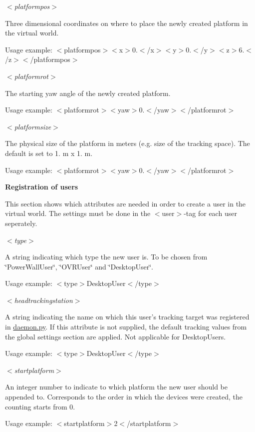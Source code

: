 {\itshape $<$platformpos$>$\/}\par
 \-Three dimensional coordinates on where to place the newly created platform in the virtual world.\par
 \-Usage example\-: {\ttfamily $<$platformpos$>$$<$x$>$0.$<$/x$>$$<$y$>$0.$<$/y$>$$<$z$>$6.$<$/z$>$$<$/platformpos$>$}

{\itshape $<$platformrot$>$\/}\par
 \-The starting yaw angle of the newly created platform.\par
 \-Usage example\-: {\ttfamily $<$platformrot$>$$<$yaw$>$0.$<$/yaw$>$$<$/platformrot$>$}

{\itshape $<$platformsize$>$\/}\par
 \-The physical size of the platform in meters (e.\-g. size of the tracking space). \-The default is set to 1. m x 1. m. \par
 \-Usage example\-: {\ttfamily $<$platformrot$>$$<$yaw$>$0.$<$/yaw$>$$<$/platformrot$>$}

\par


{\bfseries \-Registration of users}\par
 \-This section shows which attributes are needed in order to create a user in the virtual world. \-The settings must be done in the $<$user$>$-\/tag for each user seperately.

{\itshape $<$type$>$\/}\par
 \-A string indicating which type the new user is. \-To be chosen from \char`\"{}\-Power\-Wall\-User\char`\"{}, \char`\"{}\-O\-V\-R\-User\char`\"{} and \char`\"{}\-Desktop\-User\char`\"{}.\par
 \-Usage example\-: {\ttfamily $<$type$>$\-Desktop\-User$<$/type$>$}

{\itshape $<$headtrackingstation$>$\/}\par
 \-A string indicating the name on which this user's tracking target was registered in \hyperlink{daemon_8py}{daemon.\-py}. \-If this attribute is not supplied, the default tracking values from the global settings section are applied. \-Not applicable for \-Desktop\-Users.\par
 \-Usage example\-: {\ttfamily $<$type$>$\-Desktop\-User$<$/type$>$}

{\itshape $<$startplatform$>$\/}\par
 \-An integer number to indicate to which platform the new user should be appended to. \-Corresponds to the order in which the devices were created, the counting starts from 0.\par
 \-Usage example\-: {\ttfamily $<$startplatform$>$2$<$/startplatform$>$}

